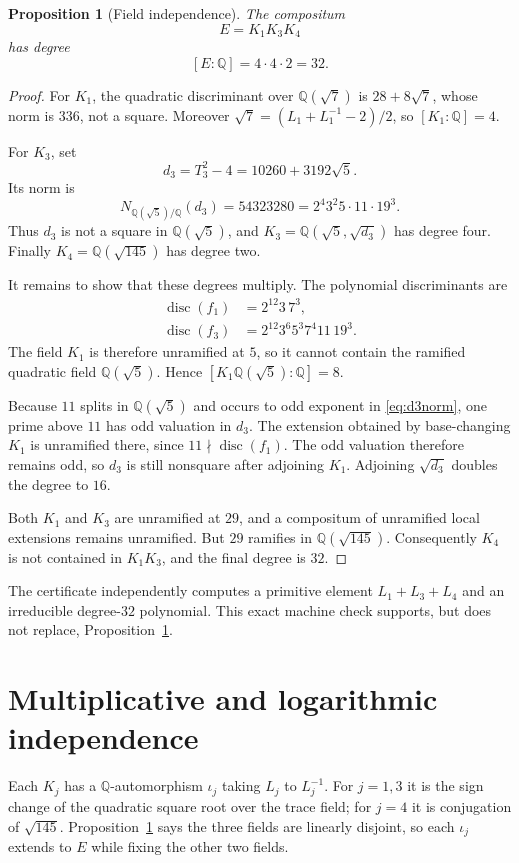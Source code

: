 \documentclass[11pt]{article}
\newtheorem{proposition}[theorem]{Proposition}
\theoremstyle{remark}\newtheorem{remark}[theorem]{Remark}
\begin{document}
\begin{proposition}[Field independence]\label{prop:degree}
The compositum
\[
E=K_1K_3K_4
\]
has degree
\[
[E:\mathbb Q]=4\cdot4\cdot2=32.
\]
\end{proposition}
\begin{proof}
For $K_1$, the quadratic discriminant over $\mathbb Q(\sqrt7)$ is
$28+8\sqrt7$, whose norm is $336$, not a square.  Moreover
$\sqrt7=(L_1+L_1^{-1}-2)/2$, so $[K_1:\mathbb Q]=4$.

For $K_3$, set
\[
d_3=T_3^2-4=10260+3192\sqrt5.
\]
Its norm is
\begin{equation}\label{eq:d3norm}
N_{\mathbb Q(\sqrt5)/\mathbb Q}(d_3)
=54323280=2^4 3^2 5\cdot11\cdot19^3.
\end{equation}
Thus $d_3$ is not a square in $\mathbb Q(\sqrt5)$, and
$K_3=\mathbb Q(\sqrt5,\sqrt{d_3})$ has degree four.  Finally
$K_4=\mathbb Q(\sqrt{145})$ has degree two.

It remains to show that these degrees multiply.  The polynomial
discriminants are
\begin{align*}
\operatorname{disc}(f_1)&=2^{12}3\,7^3,\\
\operatorname{disc}(f_3)&=2^{12}3^6 5^3 7^4 11\,19^3.
\end{align*}
The field $K_1$ is therefore unramified at $5$, so it cannot contain the
ramified quadratic field $\mathbb Q(\sqrt5)$.  Hence
$[K_1\mathbb Q(\sqrt5):\mathbb Q]=8$.

Because $11$ splits in $\mathbb Q(\sqrt5)$ and occurs to odd exponent in
\eqref{eq:d3norm}, one prime above $11$ has odd valuation in $d_3$.
The extension obtained by base-changing $K_1$ is unramified there, since
$11\nmid\operatorname{disc}(f_1)$.  The odd valuation therefore remains
odd, so $d_3$ is still nonsquare after adjoining $K_1$.  Adjoining
$\sqrt{d_3}$ doubles the degree to $16$.

Both $K_1$ and $K_3$ are unramified at $29$, and a compositum of unramified
local extensions remains unramified.  But $29$ ramifies in
$\mathbb Q(\sqrt{145})$.  Consequently $K_4$ is not contained in $K_1K_3$,
and the final degree is $32$.
\end{proof}

The certificate independently computes a primitive element
$L_1+L_3+L_4$ and an irreducible degree-$32$ polynomial.  This exact machine
check supports, but does not replace, Proposition~\ref{prop:degree}.

\section{Multiplicative and logarithmic independence}
Each $K_j$ has a $\mathbb Q$-automorphism $\iota_j$ taking
$L_j$ to $L_j^{-1}$.  For $j=1,3$ it is the sign change of the quadratic
square root over the trace field; for $j=4$ it is conjugation of
$\sqrt{145}$.  Proposition~\ref{prop:degree} says the three fields are
linearly disjoint, so each $\iota_j$ extends to $E$ while fixing the other
two fields.
\end{document}
